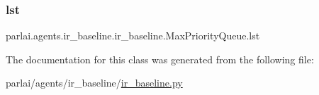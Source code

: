 \subsubsection{\texorpdfstring{lst}{lst}}
{\footnotesize\ttfamily parlai.\+agents.\+ir\+\_\+baseline.\+ir\+\_\+baseline.\+Max\+Priority\+Queue.\+lst}



The documentation for this class was generated from the following file\+:\begin{DoxyCompactItemize}
\item 
parlai/agents/ir\+\_\+baseline/\hyperlink{ir__baseline_8py}{ir\+\_\+baseline.\+py}\end{DoxyCompactItemize}
